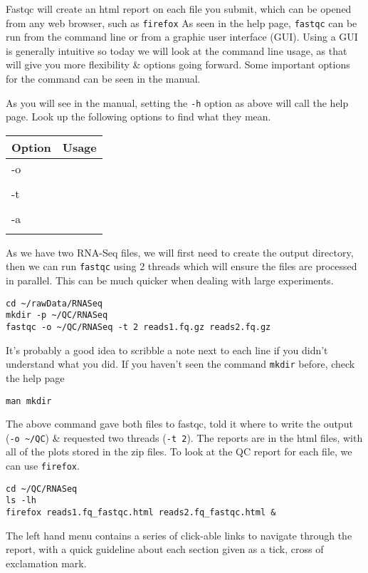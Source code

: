 \begin{note}
Fastqc will create an html report on each file you submit, which can be opened from any web browser, such as \texttt{firefox}
As seen in the help page, \texttt{fastqc} can be run from the command line or from a graphic user interface (GUI).
Using a GUI is generally intuitive so today we will look at the command line usage, as that will give you more flexibility \& options going forward.
Some important options for the command can be seen in the manual.\\
\end{note}
\begin{steps}
As you will see in the manual, setting the \texttt{-h} option as above will call the help page.
Look up the following options to find what they mean. \\
\begin{center}
\begin{tabular}[h]{|p{4cm}|p{8cm}|}
  \hline
  \textbf{Option} & \textbf{Usage} \\
  \hline
  -o & \\
   & \\
   \hline
  -t & \\
   & \\
   \hline
   -a & \\
   & \\
  \hline
\end{tabular}
\end{center}
\end{steps}

\begin{steps}
As we have two RNA-Seq files, we will first need to create the output directory, then we can run \texttt{fastqc} using 2 threads which will ensure the files are processed in parallel.
This can be much quicker when dealing with large experiments.
\begin{lstlisting}
cd ~/rawData/RNASeq
mkdir -p ~/QC/RNASeq
fastqc -o ~/QC/RNASeq -t 2 reads1.fq.gz reads2.fq.gz
\end{lstlisting}
It's probably a good idea to scribble a note next to each line if you didn't understand what you did.
If you haven't seen the command \texttt{mkdir} before, check the help page 
\begin{lstlisting}
man mkdir
\end{lstlisting}
\end{steps}

\begin{steps}
The above command gave both files to fastqc, told it where to write the output (\texttt{-o \~{}/QC}) \& requested two threads (\texttt{-t 2}). 
The reports are in the html files, with all of the plots stored in the zip files. 
To look at the QC report for each file, we can use \texttt{firefox}.
\begin{lstlisting}
cd ~/QC/RNASeq
ls -lh
firefox reads1.fq_fastqc.html reads2.fq_fastqc.html &
\end{lstlisting}
The left hand menu contains a series of click-able links to navigate through the report, with a quick guideline about each section given as a tick, cross of exclamation mark.
\end{steps}


